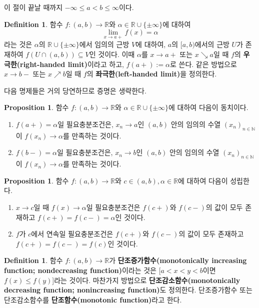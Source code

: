 \documentclass[11pt]{book}
\numberwithin{equation}{chapter}
\def\NN{\mathbb{N}}
\def\RR{\mathbb{R}}
\theoremstyle{definition}
\newtheorem{prop}[thm]{Proposition}
\newtheorem{defn}[thm]{Definition}
\newenvironment{enum}
	{\begin{enumerate}[label=(\alph*), leftmargin=2\parindent]}
	{\end{enumerate}}
\begin{document}
이 절이 끝날 때까지 \(-\infty \le a < b \le \infty\)이다.

\begin{defn}
    함수 \(f : (a, b) \to \RR\)와 \(\alpha \in \RR \cup \{\pm\infty\}\)에 대하여
    \[
    \lim_{x \to a+} f(x) = \alpha    
    \]
    라는 것은 \(\alpha\)의 \(\RR \cup \{\pm \infty\}\)에서 임의의 근방 \(V\)에 대하여, \(a\)의 \([a, b)\)에서의 근방 \(U\)가 존재하여 \(f(U \cap (a, b)) \subseteq V\)인 것이다. 이때 \(\alpha\)를 \(x \to a+\) 또는 \(x \searrow a\)일 때 \(f\)의 \textbf{우극한(right-handed limit)}이라고 하고, \(f(a+) := \alpha\)로 쓴다. 같은 방법으로 \(x \to b-\) 또는 \(x \nearrow b\)일 때 \(f\)의 \textbf{좌극한(left-handed limit)}을 정의한다.
\end{defn}

다음 명제들은 거의 당연하므로 증명은 생략한다.

\begin{prop}
    함수 \(f : (a, b) \to \RR\)와 \(\alpha \in \RR \cup \{\pm \infty\}\)에 대하여 다음이 동치이다.
    \begin{enum}
        \item \(f(a+) = \alpha\)일 필요충분조건은, \(x_n \to a\)인 \((a, b)\) 안의 임의의 수열 \((x_n)_{n \in \NN}\)이 \(f(x_n) \to \alpha\)를 만족하는 것이다.
        \item \(f(b-) = \alpha\)일 필요충분조건은, \(x_n \to b\)인 \((a, b)\) 안의 임의의 수열 \((x_n)_{n \in \NN}\)이 \(f(x_n) \to \alpha\)를 만족하는 것이다.
    \end{enum}
\end{prop}

\begin{prop}
    함수 \(f : (a, b) \to \RR\)와 \(c \in (a, b), \alpha \in \RR\)에 대하여 다음이 성립한다.
    \begin{enum}
        \item \(x \to c\)일 때 \(f(x) \to \alpha\)일 필요충분조건은 \(f(c+)\)와 \(f(c-)\)의 값이 모두 존재하고 \(f(c+) = f(c-) = \alpha\)인 것이다.
        \item \(f\)가 \(c\)에서 연속일 필요충분조건은 \(f(c+)\)와 \(f(c-)\)의 값이 모두 존재하고 \(f(c+) = f(c-) = f(c)\)인 것이다.
    \end{enum}
\end{prop}

\begin{defn}
    함수 \(f : (a, b) \to \RR\)가 \textbf{단조증가함수(monotonically increasing function; nondecreasing function)}이라는 것은 [\(a < x < y < b\)이면 \(f(x) \le f(y)\)]라는 것이다. 마찬가지 방법으로 \textbf{단조감소함수(monotonically decreasing function; nonincreasing function)}도 정의한다. 단조증가함수 또는 단조감소함수를 \textbf{단조함수(monotonic function)}라고 한다.
\end{defn}
\end{document}

